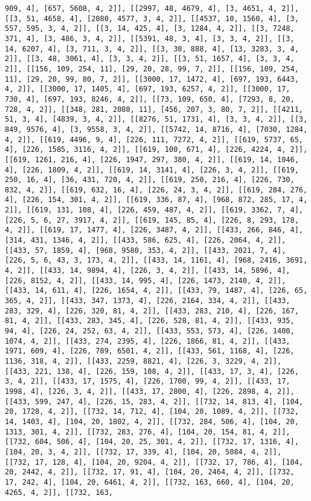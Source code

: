 \documentclass[12pt,fleqn]{article}\usepackage{../../common}
\begin{document}
\begin{verbatim}
909, 4], [657, 5608, 4, 2]], [[2997, 48, 4679, 4], [3, 4651, 4, 2]], [[3, 51, 4658, 4], [2080, 4577, 3, 4, 2]], [[4537, 10, 1560, 4], [3, 557, 595, 3, 4, 2]], [[3, 14, 425, 4], [3, 1284, 4, 2]], [[3, 7248, 371, 4], [3, 486, 3, 4, 2]], [[5391, 48, 3, 4], [3, 3, 4, 2]], [[3, 14, 6207, 4], [3, 711, 3, 4, 2]], [[3, 30, 888, 4], [13, 3283, 3, 4, 2]], [[3, 48, 3061, 4], [3, 3, 4, 2]], [[3, 51, 1657, 4], [3, 3, 4, 2]], [[156, 109, 254, 11], [29, 20, 28, 99, 7, 2]], [[156, 109, 254, 11], [29, 20, 99, 80, 7, 2]], [[3000, 17, 1472, 4], [697, 193, 6443, 4, 2]], [[3000, 17, 1405, 4], [697, 193, 6257, 4, 2]], [[3000, 17, 730, 4], [697, 193, 8246, 4, 2]], [[73, 109, 650, 4], [7293, 8, 20, 728, 4, 2]], [[348, 281, 2080, 11], [456, 207, 3, 80, 7, 2]], [[4211, 51, 3, 4], [4839, 3, 4, 2]], [[8276, 51, 1731, 4], [3, 3, 4, 2]], [[3, 849, 9576, 4], [3, 9558, 3, 4, 2]], [[5742, 14, 8716, 4], [7030, 1284, 4, 2]], [[619, 4496, 9, 4], [226, 111, 7272, 4, 2]], [[619, 5737, 65, 4], [226, 1585, 3116, 4, 2]], [[619, 100, 671, 4], [226, 4224, 4, 2]], [[619, 1261, 216, 4], [226, 1947, 297, 380, 4, 2]], [[619, 14, 1046, 4], [226, 1809, 4, 2]], [[619, 14, 3141, 4], [226, 3, 4, 2]], [[619, 250, 16, 4], [36, 431, 720, 4, 2]], [[619, 250, 216, 4], [226, 730, 832, 4, 2]], [[619, 632, 16, 4], [226, 24, 3, 4, 2]], [[619, 284, 276, 4], [226, 154, 301, 4, 2]], [[619, 336, 87, 4], [968, 872, 285, 17, 4, 2]], [[619, 131, 108, 4], [226, 459, 487, 4, 2]], [[619, 3362, 7, 4], [226, 5, 6, 27, 3917, 4, 2]], [[619, 145, 85, 4], [226, 8, 293, 178, 4, 2]], [[619, 17, 1477, 4], [226, 3487, 4, 2]], [[433, 266, 846, 4], [314, 431, 1346, 4, 2]], [[433, 586, 625, 4], [226, 2064, 4, 2]], [[433, 57, 1859, 4], [968, 9580, 353, 4, 2]], [[433, 2021, 7, 4], [226, 5, 6, 43, 3, 173, 4, 2]], [[433, 14, 1161, 4], [968, 2416, 3691, 4, 2]], [[433, 14, 9894, 4], [226, 3, 4, 2]], [[433, 14, 5896, 4], [226, 8152, 4, 2]], [[433, 14, 995, 4], [226, 1473, 2140, 4, 2]], [[433, 14, 611, 4], [226, 1654, 4, 2]], [[433, 79, 1487, 4], [226, 65, 365, 4, 2]], [[433, 347, 1373, 4], [226, 2164, 334, 4, 2]], [[433, 283, 329, 4], [226, 320, 81, 4, 2]], [[433, 283, 210, 4], [226, 167, 81, 4, 2]], [[433, 283, 345, 4], [226, 528, 81, 4, 2]], [[433, 935, 94, 4], [226, 24, 252, 63, 4, 2]], [[433, 553, 573, 4], [226, 1400, 1074, 4, 2]], [[433, 274, 2395, 4], [226, 1866, 81, 4, 2]], [[433, 1971, 609, 4], [226, 789, 6501, 4, 2]], [[433, 561, 1168, 4], [226, 1136, 318, 4, 2]], [[433, 2259, 8821, 4], [226, 3, 3229, 4, 2]], [[433, 221, 138, 4], [226, 159, 108, 4, 2]], [[433, 17, 3, 4], [226, 3, 4, 2]], [[433, 17, 1575, 4], [226, 1700, 99, 4, 2]], [[433, 17, 1998, 4], [226, 3, 4, 2]], [[433, 17, 2800, 4], [226, 2898, 4, 2]], [[433, 599, 247, 4], [226, 15, 283, 4, 2]], [[732, 14, 813, 4], [104, 20, 1728, 4, 2]], [[732, 14, 712, 4], [104, 20, 1089, 4, 2]], [[732, 14, 1403, 4], [104, 20, 1802, 4, 2]], [[732, 284, 506, 4], [104, 20, 1313, 301, 4, 2]], [[732, 283, 276, 4], [104, 20, 154, 81, 4, 2]], [[732, 604, 506, 4], [104, 20, 25, 301, 4, 2]], [[732, 17, 1316, 4], [104, 20, 3, 4, 2]], [[732, 17, 339, 4], [104, 20, 5084, 4, 2]], [[732, 17, 128, 4], [104, 20, 9204, 4, 2]], [[732, 17, 786, 4], [104, 20, 2442, 4, 2]], [[732, 17, 91, 4], [104, 20, 2464, 4, 2]], [[732, 17, 242, 4], [104, 20, 6461, 4, 2]], [[732, 163, 660, 4], [104, 20, 4265, 4, 2]], [[732, 163, 
\end{verbatim}
\end{document}
